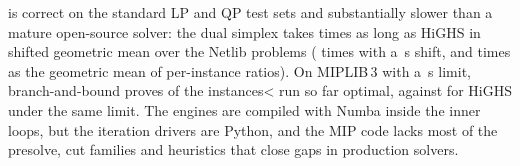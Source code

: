 \begin{honestbox}
\nirnay{} is correct on the standard LP and QP test sets and substantially slower than a mature
open-source solver: the dual simplex takes \ratioSpx{} times as long as HiGHS in shifted geometric
mean over the \nSpxTot{} Netlib problems (\ratioSpxTenShift{} times with a \shiftB\,s shift, and
\gmrSpx{} times as the geometric mean of per-instance ratios). On MIPLIB\,3 with a \tlMip\,s limit,
branch-and-bound proves \nMip{} of the \nMipTot{} instances\ifnum\nMipTot<\nMipList{} run so far\fi{} optimal, against
\nMipRefOpt{} for HiGHS under the same limit. The engines are compiled with Numba inside the
inner loops, but the iteration drivers are Python, and the MIP code lacks most of the presolve,
cut families and heuristics that close gaps in production solvers.
\end{honestbox}
